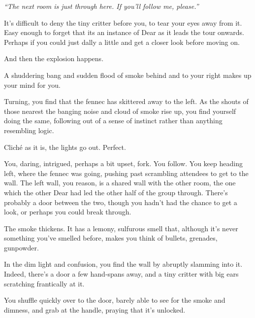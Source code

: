 \emph{``The next room is just through here. If you'll follow me, please.''}

It's difficult to deny the tiny critter before you, to tear your eyes away from it. Easy enough to forget that its an instance of Dear as it leads the tour onwards. Perhaps if you could just dally a little and get a closer look before moving on.

And then the explosion happens.

\vfill

\newpage

\null
\vfill

A shuddering bang and sudden flood of smoke behind and to your right makes up your mind for you.

Turning, you find that the fennec has skittered away to the left. As the shouts of those nearest the banging noise and cloud of smoke rise up, you find yourself doing the same, following out of a sense of instinct rather than anything resembling logic.

\vfill

\newpage

\null
\vfill

Cliché as it is, the lights go out. Perfect.

\vfill

\newpage

\null
\vfill

You, daring, intrigued, perhaps a bit upset, fork. You follow. You keep heading left, where the fennec was going, pushing past scrambling attendees to get to the wall. The left wall, you reason, is a shared wall with the other room, the one which the other Dear had led the other half of the group through. There's probably a door between the two, though you hadn't had the chance to get a look, or perhaps you could break through.

The smoke thickens. It has a lemony, sulfurous smell that, although it's never something you've smelled before, makes you think of bullets, grenades, gunpowder.

In the dim light and confusion, you find the wall by abruptly slamming into it. Indeed, there's a door a few hand-spans away, and a tiny critter with big ears scratching frantically at it.

You shuffle quickly over to the door, barely able to see for the smoke and dimness, and grab at the handle, praying that it's unlocked.

\vfill


